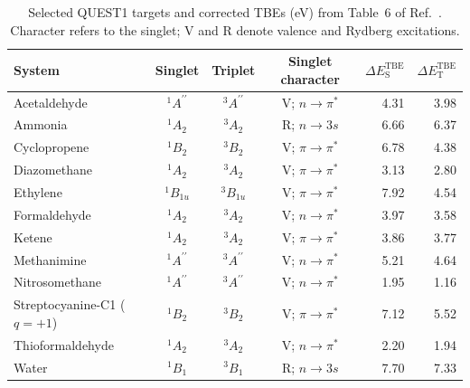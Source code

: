\begin{table}[htbp]
\centering
\caption{Selected QUEST1 targets and corrected TBEs (eV) from Table~6 of Ref.~. Character refers to the singlet; V and R denote valence and Rydberg excitations.}
\label{tab:si_states_quest1}
\small
\setlength{\tabcolsep}{6pt}
\begin{tabular}{@{}lcccrr@{}}
\hline
System & Singlet & Triplet & Singlet character & $\Delta E_{\mathrm{S}}^{\mathrm{TBE}}$ & $\Delta E_{\mathrm{T}}^{\mathrm{TBE}}$ \\
\hline
Acetaldehyde & ${}^{1}A^{\prime\prime}$ & ${}^{3}A^{\prime\prime}$ & V; $n\to\pi^*$ & 4.31 & 3.98 \\
Ammonia & ${}^{1}A_2$ & ${}^{3}A_2$ & R; $n\to3s$ & 6.66 & 6.37 \\
Cyclopropene & ${}^{1}B_2$ & ${}^{3}B_2$ & V; $\pi\to\pi^*$ & 6.78 & 4.38 \\
Diazomethane & ${}^{1}A_2$ & ${}^{3}A_2$ & V; $\pi\to\pi^*$ & 3.13 & 2.80 \\
Ethylene & ${}^{1}B_{1u}$ & ${}^{3}B_{1u}$ & V; $\pi\to\pi^*$ & 7.92 & 4.54 \\
Formaldehyde & ${}^{1}A_2$ & ${}^{3}A_2$ & V; $n\to\pi^*$ & 3.97 & 3.58 \\
Ketene & ${}^{1}A_2$ & ${}^{3}A_2$ & V; $\pi\to\pi^*$ & 3.86 & 3.77 \\
Methanimine & ${}^{1}A^{\prime\prime}$ & ${}^{3}A^{\prime\prime}$ & V; $n\to\pi^*$ & 5.21 & 4.64 \\
Nitrosomethane & ${}^{1}A^{\prime\prime}$ & ${}^{3}A^{\prime\prime}$ & V; $n\to\pi^*$ & 1.95 & 1.16 \\
Streptocyanine-C1 ($q=+1$) & ${}^{1}B_2$ & ${}^{3}B_2$ & V; $\pi\to\pi^*$ & 7.12 & 5.52 \\
Thioformaldehyde & ${}^{1}A_2$ & ${}^{3}A_2$ & V; $n\to\pi^*$ & 2.20 & 1.94 \\
Water & ${}^{1}B_1$ & ${}^{3}B_1$ & R; $n\to3s$ & 7.70 & 7.33 \\
\hline\hline
\end{tabular}
\end{table}
